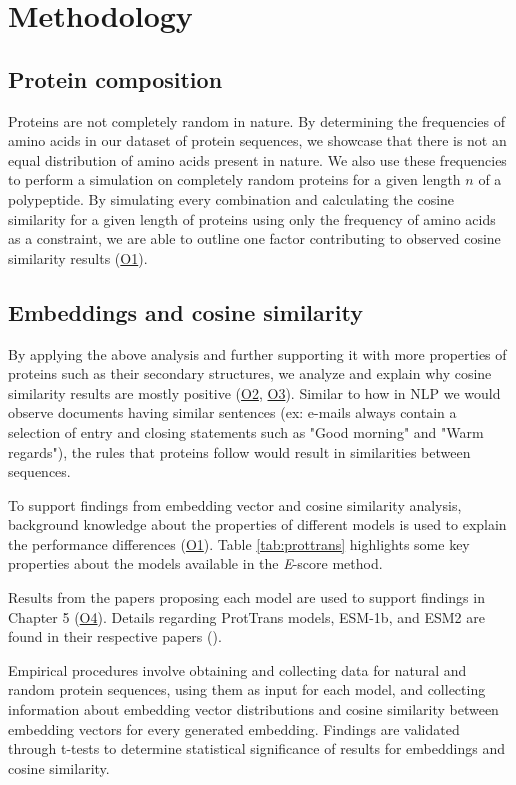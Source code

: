 \chapter{Methodology}

\section{Protein composition}
Proteins are not completely random in nature. By determining the frequencies of amino acids in our dataset of protein sequences, we showcase that there is not an equal distribution of amino acids present in nature. We also use these frequencies to perform a simulation on completely random proteins for a given length \(n\) of a polypeptide. By simulating every combination and calculating the cosine similarity for a given length of proteins using only the frequency of amino acids as a constraint, we are able to outline one factor contributing to observed cosine similarity results (\hyperlink{O1}{O1}).

\section{Embeddings and cosine similarity}
By applying the above analysis and further supporting it with more properties of proteins such as their secondary structures, we analyze and explain why cosine similarity results are mostly positive (\hyperlink{O2}{O2}, \hyperlink{O3}{O3}). Similar to how in \gls{NLP} we would observe documents having similar sentences (ex: e-mails always contain a selection of entry and closing statements such as "Good morning" and "Warm regards"), the rules that proteins follow would result in similarities between sequences.

To support findings from embedding vector and cosine similarity analysis, background knowledge about the properties of different models is used to explain the performance differences (\hyperlink{O1}{O1}). Table \ref{tab:prottrans} highlights some key properties about the models available in the \textit{E}-score method.

Results from the papers proposing each model are used to support findings in Chapter 5 (\hyperlink{O4}{O4}). Details regarding ProtTrans models, ESM-1b, and ESM2 are found in their respective papers (\cite{Elnaggar:2021, Elnaggar:2022, Rives:2021, Rao:2020, Lin:2022}).

Empirical procedures involve obtaining and collecting data for natural and random protein sequences, using them as input for each model, and collecting information about embedding vector distributions and cosine similarity between embedding vectors for every generated embedding. Findings are validated through t-tests to determine statistical significance of results for embeddings and cosine similarity.


